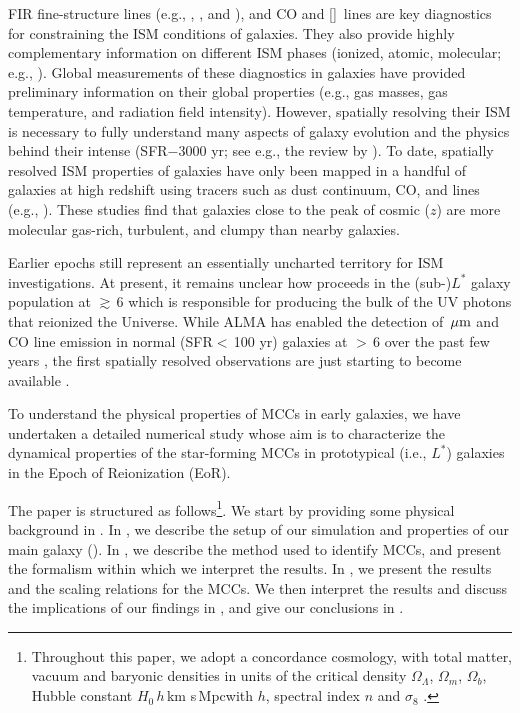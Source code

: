\IfFileExists{emulateapjlegacy.cls}{\documentclass[iop]{emulateapjlegacy}}{\documentclass[iop]{emulateapj}}
\begin{document}
FIR fine-structure lines (e.g., \cii, \nii, and \oiii), and CO and [\ci]~lines are key diagnostics for constraining the ISM conditions of galaxies. They also provide highly complementary information on different ISM phases (ionized, atomic, molecular; e.g., \citealt{Scoville74a, Rubin85a, Malhotra01a}).
%
Global measurements of these diagnostics in \highz galaxies have provided preliminary information on their global properties (e.g., gas masses, gas temperature, and radiation field intensity). However, spatially resolving their ISM is necessary to fully understand many aspects of galaxy evolution and the physics behind their intense \SF (SFR$-$3000\,\Msun\,yr\pmOne; 
see e.g., the review by \citealt{CW13}).
%
To date, spatially resolved ISM properties of \highz galaxies have only been mapped in a handful of 
galaxies at high redshift using tracers such as dust continuum, CO, and \cii lines (e.g., \citealt{Swinbank11a, Hodge15a, Ferkinhoff15a, 
Hodge16a, Leung19a}). These studies find that galaxies close to the peak of cosmic \SF ($z$) are more molecular gas-rich, turbulent, and clumpy than nearby galaxies.

Earlier epochs still represent an essentially uncharted territory for ISM investigations. At present, it remains unclear how \SF proceeds in the (sub-)$L^*$ galaxy population at \z$\gtrsim$\,6  which is responsible for producing the bulk of the UV photons that reionized the Universe.
%
While ALMA has enabled the detection of \,$\mbox{$\mu$m}$ and CO line emission in normal (SFR$<$\,100\,\Msun\,yr\pmOne) galaxies at \z$>$\,6 over the past few years \citep[e.g.,][]{Carniani18b, Odorico18a}, the first spatially resolved observations are just starting to become available \citep[e.g., ][]{Jones17a,Smit18a}.

To understand the physical properties of MCCs in early galaxies,
we have undertaken a detailed numerical study whose aim is to characterize the dynamical properties of the star-forming %
MCCs
in prototypical (i.e., $L^*$) galaxies in the Epoch of Reionization (EoR).

The paper is structured as follows\footnote{Throughout this paper, we adopt a concordance cosmology, with total matter, vacuum and baryonic densities in units of the critical density $\Omega_{\Lambda}$, $\Omega_m$, $\Omega_b$, Hubble constant $H_0$\,$h$\,km s\pmOne\,Mpc\pmOne with $h$, spectral index $n$ and $\sigma_8$ \citep{Planck14a}.}. We start by providing some physical background in . In , we describe the setup of our simulation and properties of our main galaxy (\flower). In , we describe the method used to identify
MCCs,
and present the formalism within which we interpret the results. In , we present the results and the scaling relations for the MCCs. We then interpret the results and discuss the implications of our findings in , and give our conclusions in .
%
\end{document}
